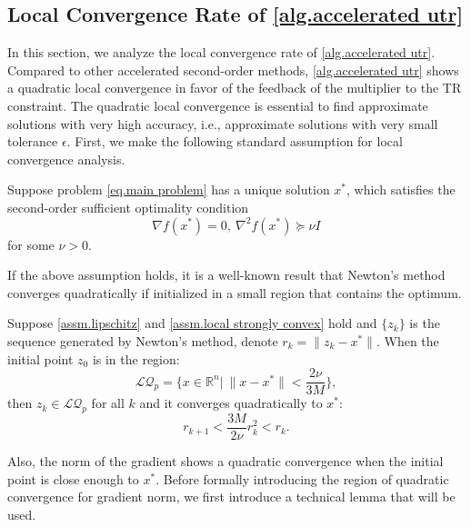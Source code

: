 \documentclass{article}
\begin{document}
\subsection{Local Convergence Rate of \autoref{alg.accelerated utr}}
\label{sec.local}
In this section, we analyze the local convergence rate of \autoref{alg.accelerated utr}. Compared to other accelerated second-order methods, \autoref{alg.accelerated utr} shows a quadratic local convergence in favor of the feedback of the multiplier to the TR constraint. The quadratic local convergence is essential to find approximate solutions with very high accuracy, i.e., approximate solutions with very small tolerance $\epsilon$. First, we make the following standard assumption for local convergence analysis.
\begin{assumption}
    \label{assm.local strongly convex}
    Suppose problem \eqref{eq.main problem} has a unique solution $x^*$, which satisfies the second-order sufficient optimality condition
    \begin{equation}
        \label{eq.second-order suff cond}
        \nabla f(x^*)=0, \ \nabla^2 f(x^*)\succeq \nu I  
    \end{equation}
    for some $\nu >0$.
\end{assumption}
If the above assumption holds, it is a well-known result that Newton's method converges quadratically if initialized in a small region that contains the optimum.
\begin{lemma}
\label{lem.quadratic point}
    Suppose \autoref{assm.lipschitz} and \autoref{assm.local strongly convex} hold and $\{z_k\}$ is the sequence generated by Newton's method, denote $r_k = \|z_k-x^*\|$. When the initial point $z_0$ is in the region:
    \begin{equation}
        \label{eq.local quadratic region}
        \mathcal{LQ}_p = \{x\in\mathbb{R}^n| \ \|x-x^*\| < \frac{2\nu}{3M}\}, 
    \end{equation}
    then $z_k \in \mathcal{LQ}_p$ for all $k$ and it converges quadratically to $x^*$:
    \begin{equation}
        \label{eq.quadratic convergence}
        r_{k+1} < \frac{3M}{2\nu}r_k^2<r_k.
    \end{equation}
\end{lemma}
Also, the norm of the gradient shows a quadratic convergence when the initial point is close enough to $x^*$. Before formally introducing the region of quadratic convergence for gradient norm, we first introduce a technical lemma that will be used.
\end{document}
